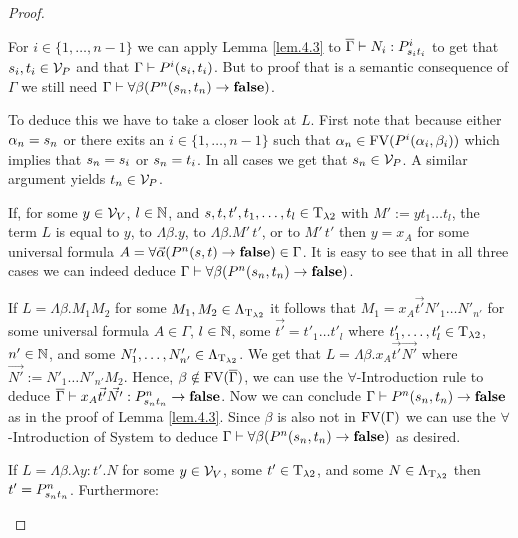 \begin{proof}
\begin{itemize}
		\begin{figure}[H]
			\centering
			
		\end{figure}
		
		For $i\in\{1,\dots,n-1\}$ we can apply Lemma \ref{lem.4.3} to $\trans{\Gamma}\lambdaModels N_i:\code{P^i}{\predTFst[i]}{\predTSnd[i]}$ to get that $\predTFst[i],\predTSnd[i]\in\VarP$ and that $\Gamma\PModels P^i(\predTFst[i],\predTSnd[i])$. But to proof that \false{} is a semantic consequence of $\Gamma$ we still need $\Gamma\PModels\forall\beta(P^n(\predTFst[n],\predTSnd[n])\to\false)$.
		
		To deduce this we have to take a closer look at $L$. First note that because either $\predFst[n]=\predTFst[n]$ or there exits an $i\in\{1,\dots,n-1\}$ such that $\predFst[n]\in\FV(P^i(\predFst[i],\predSnd[i]))$ which implies that $\predTFst[n]=\predTFst[i]$ or $\predTFst[n]=\predTSnd[i]$. In all cases we get that $\predTFst[n]\in\VarP$. A similar argument yields $\predTSnd[n]\in\VarP$.
		
		If, for some $y\in\mathcal{V}_V$, $l\in\mathbb{N}$, and $s,t,t',t_1,\dots,t_l\in\text{T}_{\lambda2}$ with $M':=yt_1\dots t_l$, the term $L$ is equal to $y$, to $\Lambda\beta.y$, to $\Lambda\beta.M'\,t'$, or to $M'\,t'$ then $y=x_A$ for some universal formula $A=\forall\vec{\alpha}(P^n(\predTFst,\predTSnd)\to\false)\in\Gamma$. It is easy to see that in all three cases we can indeed deduce $\Gamma\PModels\forall\beta(P^n(\predTFst[n],\predTSnd[n])\to\false)$.
		
		If $L=\Lambda\beta.M_1M_2$ for some $M_1,M_2\in\Lambda_{\text{T}_{\lambda2}}$ it follows that $M_1=x_A\vec{t'}N'_1\dots N'_{n'}$ for some universal formula $A\in\Gamma$, $l\in\mathbb{N}$, some $\vec{t'}=t'_1\dots t'_l$ where $t'_1,\dots,t'_l\in\text{T}_{\lambda2}$, $n'\in\mathbb{N}$, and some $N'_1,\dots,N'_{n'}\in\Lambda_{\text{T}_{\lambda2}}$. We get that $L=\Lambda\beta.x_A\vec{t'}\vec{N'}$ where $\vec{N'}:=N'_1\dots N'_{n'}M_2$. Hence,  $\beta\notin\text{FV}(\overline{\Gamma})$, we can use the $\forall$-Introduction rule to deduce $\trans{\Gamma}\lambdaModels x_A\vec{t'}\vec{N'}:\code{P^n}{\predTFst[n]}{\predTSnd[n]}\to\false$. Now we can conclude $\Gamma\PModels P^n(\predTFst[n],\predTSnd[n])\to\false$ as in the proof of Lemma \ref{lem.4.3}. %
		Since $\beta$ is also not in $\text{FV}(\Gamma)$ we can use the $\forall$-Introduction of System \SysP{} to deduce $\Gamma\PModels\forall\beta(P^n(\predTFst[n],\predTSnd[n])\to\false)$ as desired.
		
		If $L=\Lambda\beta.\lambda y:t'.N$ for some $y\in\mathcal{V}_V$, some $t'\in\text{T}_{\lambda2}$, and some $N\in\Lambda_{\text{T}_{\lambda2}}$ then $t'=\code{P^n}{\predTFst[n]}{\predTSnd[n]}$. Furthermore:
		

\end{itemize}
\end{proof}
